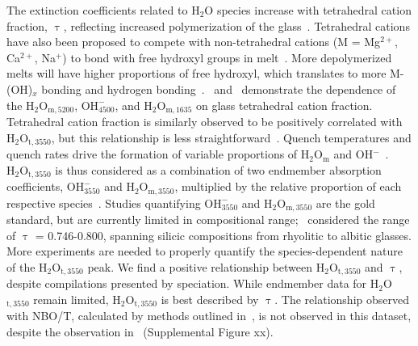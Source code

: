 \documentclass[draft]{agujournal2019}
\begin{document}
The extinction coefficients related to H$_2$O species increase with tetrahedral cation fraction, $\uptau$, reflecting increased polymerization of the glass~\cite{Stolper1982}. Tetrahedral cations have also been proposed to compete with non-tetrahedral cations (M = Mg$^{2+}$, Ca$^{2+}$, Na$^{+}$) to bond with free hydroxyl groups in melt~\cite{Mercieretal2010, Pandyaetal1992}. More depolymerized melts will have higher proportions of free hydroxyl, which translates to more M-(OH)$_x$ bonding and hydrogen bonding~\cite{Mercieretal2010, Xue2009}.~ and~ demonstrate the dependence of the \textepsilon${\mathrm{H_2O_{m, 5200}}}$, \textepsilon${\mathrm{OH^{-}_{4500}}}$, and \textepsilon${\mathrm{H_2O_{m, 1635}}}$ on glass tetrahedral cation fraction. Tetrahedral cation fraction is similarly observed to be positively correlated with \textepsilon${\mathrm{H_2O_{t, 3550}}}$, but this relationship is less straightforward~\cite{Mercieretal2010}. Quench temperatures and quench rates drive the formation of variable proportions of H$_{2}$O$_{\mathrm{m}}$ and OH$^{-}$~\cite{SilverandStolper1989, Stolper1989}. \textepsilon${\mathrm{H_2O_{t, 3550}}}$ is thus considered as a combination of two endmember absorption coefficients, \textepsilon${\mathrm{OH^{-}_{3550}}}$ and \textepsilon${\mathrm{H_2O_{m, 3550}}}$, multiplied by the relative proportion of each respective species~\cite{McIntoshetal2017, Newmanetal1986, Okumuraetal2003}. Studies quantifying \textepsilon${\mathrm{OH^{-}_{3550}}}$ and \textepsilon${\mathrm{H_2O_{m, 3550}}}$ are the gold standard, but are currently limited in compositional range;~ considered the range of $\uptau$ = 0.746-0.800, spanning silicic compositions from rhyolitic to albitic glasses. More experiments are needed to properly quantify the species-dependent nature of the $\mathrm{H_2O_{t, 3550}}$ peak. We find a positive relationship between \textepsilon${\mathrm{H_2O_{t, 3550}}}$ and $\uptau$, despite compilations presented by speciation. While endmember data for H$_{2}$O$_{\mathrm{t, 3550}}$ remain limited, \textepsilon${\mathrm{H_2O_{t, 3550}}}$ is best described by $\uptau$. The relationship observed with NBO/T, calculated by methods outlined in~, is not observed in this dataset, despite the observation in~ (Supplemental Figure xx). 
\end{document}
